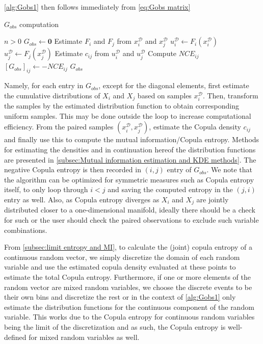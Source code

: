 \documentclass[../Thesis.tex]{subfiles}
\begin{document}
\autoref{alg:Gobs1} then follows immediately from \autoref{eq:Gobs matrix}
\begin{algorithm}[H]
    \caption{$G_{obs}$ computation}\label{alg:Gobs1}
    \begin{algorithmic}
        \Require $n > 0$             
        \State $G_{obs} \gets \boldsymbol 0$
        \State Estimate $F_i$ and $F_j$ from $x_i^{\mathcal{D}}$ and $x_j^{\mathcal{D}}$
        \State $u_i^{\mathcal{D}} \gets F_i(x_i^{\mathcal{D}})$
        \State $u_j^{\mathcal{D}} \gets F_j(x_j^{\mathcal{D}})$
        \State Estimate $c_{ij}$ from $u_i^{\mathcal{D}}$ and $u_j^{\mathcal{D}}$
        \State Compute $NCE_{ij}$
        \State $\left[G_{obs}\right]_{ij} \gets -NCE_{ij}$
        \EndFor
        \State \Return $G_{obs}$
    \end{algorithmic}
\end{algorithm}
Namely, for each entry in $G_{obs}$, except for the diagonal elements, first estimate the cumulative distributions of $X_i$ and $X_j$ based on samples $x_i^{\mathcal{D}}$. Then, transform the samples by the estimated distribution function to obtain corresponding uniform samples. This may be done outside the loop to increase computational efficiency. From the paired samples $(x_i^{\mathcal{D}},x_j^{\mathcal{D}})$, estimate the Copula density $c_{ij}$ and finally use this to compute the mutual information/Copula entropy. Methods for estimating the densities and in continuation hereof the distribution functions are presented in \autoref{subsec:Mutual information estimation and KDE methods}. The negative Copula entropy is then recorded in $(i,j)$ entry of $G_{obs}$. We note that the algorithm can be optimized for symmetric measures such as Copula entropy itself, to only loop through $i<j$ and saving the computed entropy in the $(j,i)$ entry as well. Also, as Copula entropy diverges as $X_i$ and $X_j$ are jointly distributed closer to a one-dimensional manifold, ideally there should be a check for such or the user should check the paired observations to exclude such variable combinations.

From \autoref{subsec:limit entropy and MI}, to calculate the (joint) copula entropy of a continuous random vector, we simply discretize the domain of each random variable and use the estimated copula density evaluated at these points to estimate the total Copula entropy. Furthermore, if one or more elements of the random vector are mixed random variables, we choose the discrete events to be their own bins and discretize the rest or in the context of \autoref{alg:Gobs1} only estimate the distribution functions for the continuous component of the random variable. This works due to the Copula entropy for continuous random variables being the limit of the discretization and as such, the Copula entropy is well-defined for mixed random variables as well.
\end{document}
